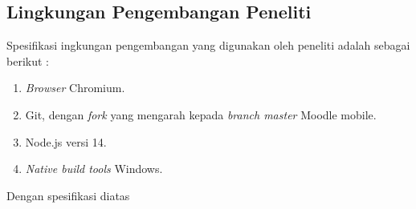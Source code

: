 \subsection{Lingkungan Pengembangan Peneliti}
Spesifikasi ingkungan pengembangan yang digunakan oleh peneliti adalah sebagai berikut :

\begin{enumerate}
	\item \textit{Browser} Chromium.
	\item Git, dengan \textit{fork} yang mengarah kepada \textit{branch master} Moodle mobile.
	\item Node.js versi 14.
	\item \textit{Native build tools} Windows.
\end{enumerate} 

Dengan spesifikasi diatas